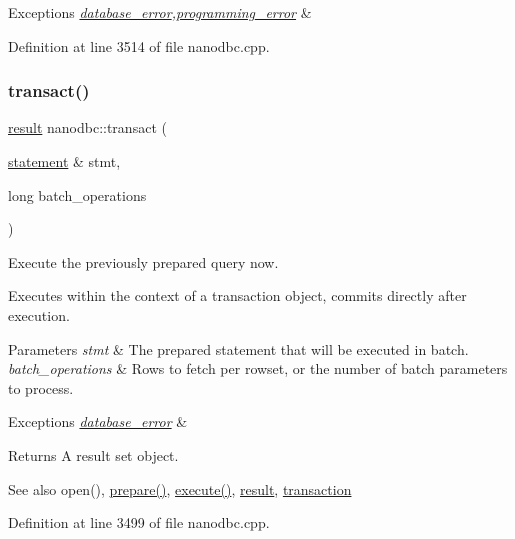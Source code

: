 \begin{DoxyExceptions}{Exceptions}
{\em \mbox{\hyperlink{classnanodbc_1_1database__error}{database\+\_\+error}},\mbox{\hyperlink{classnanodbc_1_1programming__error}{programming\+\_\+error}}} & \\
\hline
\end{DoxyExceptions}


Definition at line 3514 of file nanodbc.\+cpp.

\mbox{\label{group__mainf_ga3f5b3e15f31690ef54ca20058ea89074}} 
\subsubsection{\texorpdfstring{transact()}{transact()}}
{\footnotesize\ttfamily \mbox{\hyperlink{classnanodbc_1_1result}{result}} nanodbc\+::transact (\begin{DoxyParamCaption}\item[{\mbox{\hyperlink{classnanodbc_1_1statement}{statement}} \&}]{stmt,  }\item[{long}]{batch\+\_\+operations }\end{DoxyParamCaption})}



Execute the previously prepared query now. 

Executes within the context of a transaction object, commits directly after execution. 
\begin{DoxyParams}{Parameters}
{\em stmt} & The prepared statement that will be executed in batch. \\
\hline
{\em batch\+\_\+operations} & Rows to fetch per rowset, or the number of batch parameters to process. \\
\hline
\end{DoxyParams}

\begin{DoxyExceptions}{Exceptions}
{\em \mbox{\hyperlink{classnanodbc_1_1database__error}{database\+\_\+error}}} & \\
\hline
\end{DoxyExceptions}
\begin{DoxyReturn}{Returns}
A result set object. 
\end{DoxyReturn}
\begin{DoxySeeAlso}{See also}
open(), \mbox{\hyperlink{group__mainf_ga961a75629487f22ebc87d114c5699bc2}{prepare()}}, \mbox{\hyperlink{group__mainf_ga5cbac617a3964611bd16a2fc6f991b83}{execute()}}, \mbox{\hyperlink{classnanodbc_1_1result}{result}}, \mbox{\hyperlink{classnanodbc_1_1transaction}{transaction}} 
\end{DoxySeeAlso}


Definition at line 3499 of file nanodbc.\+cpp.


